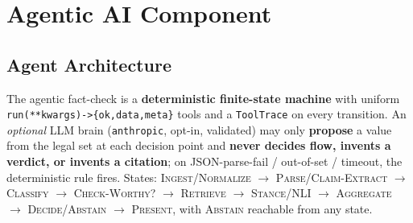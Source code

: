 \documentclass[12pt,a4paper]{article}
\begin{document}
\section{Agentic AI Component}

\subsection{Agent Architecture}

The agentic fact-check is a \textbf{deterministic finite-state machine} with uniform \texttt{run(**kwargs)->\{ok,data,meta\}} tools and a \texttt{ToolTrace} on every transition. An \emph{optional} LLM brain (\texttt{anthropic}, opt-in, validated) may only \textbf{propose} a value from the legal set at each decision point and \textbf{never decides flow, invents a verdict, or invents a citation}; on JSON-parse-fail / out-of-set / timeout, the deterministic rule fires. States: \textsc{Ingest/Normalize} $\rightarrow$ \textsc{Parse/Claim-Extract} $\rightarrow$ \textsc{Classify} $\rightarrow$ \textsc{Check-Worthy?} $\rightarrow$ \textsc{Retrieve} $\rightarrow$ \textsc{Stance/NLI} $\rightarrow$ \textsc{Aggregate} $\rightarrow$ \textsc{Decide/Abstain} $\rightarrow$ \textsc{Present}, with \textsc{Abstain} reachable from any state.
\end{document}
